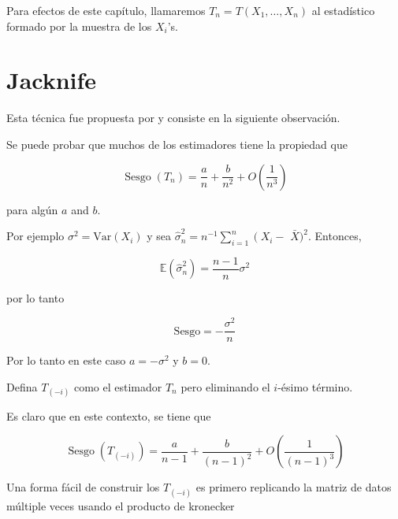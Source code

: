 \documentclass[
  12pt,
]{book}
\theoremstyle{definition}
\theoremstyle{definition}
\theoremstyle{definition}
\theoremstyle{remark}
\let\BeginKnitrBlock\begin \let\EndKnitrBlock\end
\begin{document}
\BeginKnitrBlock{remark}
{}Para efectos de este capítulo, llamaremos \(T_{n}=T\left(  X_{1},\ldots,X_{n}\right)\) al estadístico formado por la muestra de
los \(X_{i}\)'s.
\EndKnitrBlock{remark}

\hypertarget{jacknife}{%
\section{Jacknife}\label{jacknife}}

Esta técnica fue propuesta por \cite{Quenouille1949} y consiste en la
siguiente observación.

Se puede probar que muchos de los estimadores tiene la propiedad que

\begin{equation}
\operatorname{Sesgo}\left(T_{n}\right)=\frac{a}{n}+\frac{b}{n^{2}}+O\left(\frac{1}{n^{3}}\right)
\end{equation}

para algún \(a\) and \(b\).

Por ejemplo \(\sigma^{2}=\mathrm{Var}\left(X_{i}\right)\) y sea
\(\widehat{\sigma}_{n}^{2}=n^{-1} \sum_{i=1}^{n}\left(X_{i}-\right.\)
\(\bar{X})^{2}\). Entonces,

\begin{equation*}
\mathbb{E}\left(\widehat{\sigma}_{n}^{2}\right)=
\frac{n-1}{n}\sigma^{2}
\end{equation*}

por lo tanto

\begin{equation*}
\mathrm{Sesgo} = -\frac{\sigma^{2}}{n}
\end{equation*}

Por lo tanto en este caso \(a=-\sigma^{2}\) y \(b=0\).

Defina \(T_{(-i)}\) como el estimador \(T_{n}\) pero eliminando el
\(i\)-ésimo término.

Es claro que en este contexto, se tiene que

\begin{equation}
\operatorname{Sesgo}\left(T_{(-i)}\right)=\frac{a}{n-1}+\frac{b}{(n-1)^{2}}+O\left(\frac{1}{(n-1)^{3}}\right)
\end{equation}

\BeginKnitrBlock{exercise}
\protect\hypertarget{exr:unnamed-chunk-67}{}{\label{exr:unnamed-chunk-67} }Una forma fácil de construir los \(T_{(-i)}\) es primero replicando
la matriz de datos múltiple veces usando el producto de kronecker
\EndKnitrBlock{exercise}
\end{document}
